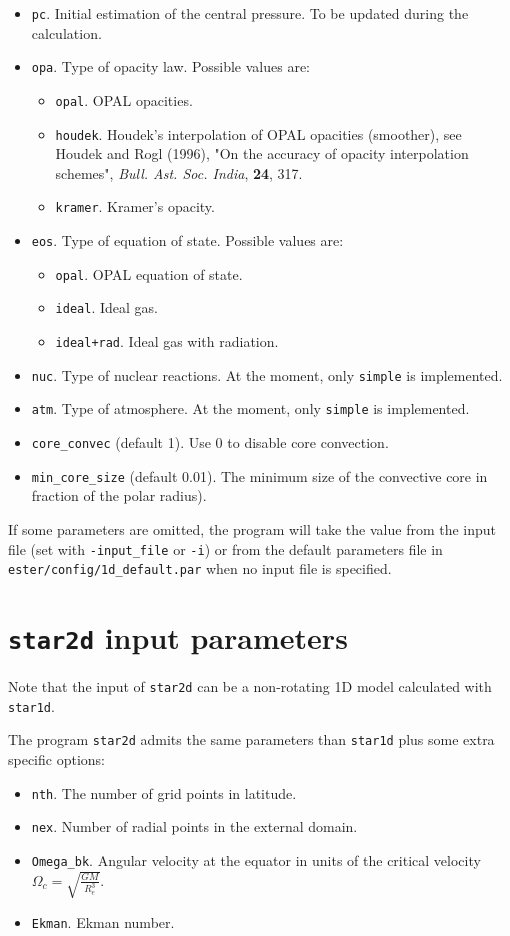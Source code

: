 \begin{itemize}
\item {\tt pc}. Initial estimation of the central pressure. To be updated during the
calculation.
\item {\tt opa}. Type of opacity law. Possible values are:
\begin{itemize}
\item {\tt opal}. OPAL opacities.
\item {\tt houdek}. Houdek's interpolation of OPAL opacities (smoother),
see Houdek and Rogl (1996), "On the accuracy of opacity interpolation
schemes", {\it Bull. Ast. Soc. India}, {\bf 24}, 317.
\item {\tt kramer}. Kramer's opacity.
\end{itemize}
\item {\tt eos}. Type of equation of state. Possible values are:
\begin{itemize}
\item {\tt opal}. OPAL equation of state.
\item {\tt ideal}. Ideal gas.
\item {\tt ideal+rad}. Ideal gas with radiation.
\end{itemize}
\item {\tt nuc}. Type of nuclear reactions. At the moment, only {\tt simple} is implemented.
\item {\tt atm}. Type of atmosphere. At the moment, only {\tt simple} is implemented.
\item {\tt core\_convec} (default 1). Use 0 to disable core convection.
\item {\tt min\_core\_size} (default 0.01). The minimum size of the convective core
in fraction of the polar radius).
\end{itemize}
If some parameters are omitted, the program will take the value from the input file (set with
{\tt -input\_file} or {\tt -i}) or from the default parameters file in 
{\tt ester/config/1d\_default.par} when no input file is specified.


\section{{\tt star2d} input parameters}

Note that the input of {\tt star2d} can be a non-rotating 1D model calculated 
with {\tt star1d}.

The program {\tt star2d} admits the same parameters than {\tt star1d}
plus some extra specific options:

\begin{itemize}
\item {\tt nth}. The number of grid points in latitude.
\item {\tt nex}. Number of radial points in the external domain.
\item {\tt Omega\_bk}. Angular velocity at the equator in units of the critical velocity
$\Omega_c=\sqrt{\frac{GM}{R_e^3}}$.
\item {\tt Ekman}. Ekman number.
\end{itemize}

